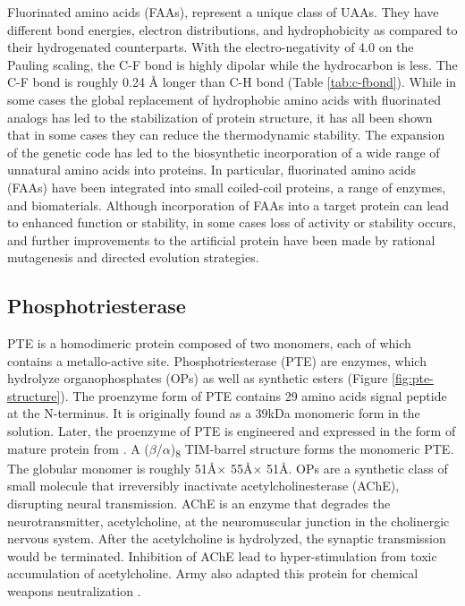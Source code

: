 \begin{refsection}
Fluorinated amino acids (FAAs), represent a unique class of UAAs. They have
different bond energies, electron distributions, and
hydrophobicity\cite{Biffinger2004} as compared to their hydrogenated
counterparts. With the electro-negativity of 4.0 on the Pauling scaling, the
C-F bond is highly dipolar while the hydrocarbon is less. The C-F bond is
roughly 0.24 {\AA} longer than C-H bond (Table
\ref{tab:c-fbond})\cite{Tang2001}. While in some cases the global replacement
of hydrophobic amino acids with fluorinated analogs has led to the
stabilization of protein structure\cite{Biffinger2004}, it has all been shown
that in some cases they can reduce the thermodynamic
stability\cite{Panchenko2006b}. The expansion of the genetic code has led to
the biosynthetic incorporation of a wide range of unnatural amino acids into
proteins\cite{Voloshchuk2010}. In particular, fluorinated amino acids (FAAs)
have been integrated into small coiled-coil
proteins\cite{Montclare2009b,Tang2001}, a range of
enzymes\cite{Voloshchuk2009,Panchenko2006b,Voloshchuk2007b,Mehta2011b,Hammill2007},
and biomaterials\cite{Yuvienco2012b}. Although incorporation of FAAs into a
target protein can lead to enhanced function or stability, in some cases loss
of activity or stability occurs, and further improvements to the artificial
protein have been made by rational mutagenesis\cite{Voloshchuk2007b} and
directed evolution strategies\cite{Montclare2006b}.

\subsection{Phosphotriesterase} 
\label{sec:pte-intro}

PTE is a homodimeric protein composed of two monomers, each of which contains a
metallo-active site. Phosphotriesterase (PTE) are enzymes, which hydrolyze
organophosphates (OPs) as well as synthetic esters (Figure
\ref{fig:pte-structure})\cite{Ghanem2005a}. The proenzyme form of PTE contains
29 amino acids signal peptide at the N-terminus. It is originally found as a
39kDa monomeric form in the solution\cite{Mulbry1989}. Later, the proenzyme of
PTE is engineered and expressed in the form of mature protein from . A ($\beta$/$\alpha$)\textsubscript{8} TIM-barrel structure forms the
monomeric PTE\cite{Roodveldt2005,Seibert2005}. The globular monomer is roughly
51\AA $\times$ 55\AA $\times$ 51\AA.  OPs are a synthetic class of small molecule
that irreversibly inactivate acetylcholinesterase (AChE), disrupting
neural transmission. AChE is an enzyme that degrades the neurotransmitter,
acetylcholine, at the neuromuscular junction in the cholinergic nervous system.
After the acetylcholine is hydrolyzed, the synaptic transmission would be
terminated. Inhibition of AChE lead to hyper-stimulation from toxic
accumulation of acetylcholine\cite{Soreq2001}. Army also adapted this protein
for chemical weapons neutralization \cite{Yang2014a}.


\end{refsection}
